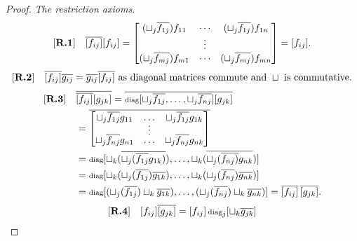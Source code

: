 \begin{proof}
  \emph{The restriction axioms.}
  \begin{align*}
    [\text{\bfseries {R}.{1}}] \quad& \overline{[f_{ij}]}[f_{ij}] =
      \begin{bmatrix}
        (\sqcup_j \overline{f_{1j}}) f_{11} & \cdots & (\sqcup_j \overline{f_{1 j}}) f_{1n}\\
        & \vdots & \\
        (\sqcup_j \overline{f_{mj}}) f_{m1} & \cdots & (\sqcup_j \overline{f_{mj}}) f_{m n}
      \end{bmatrix} = [f_{ij}].\\
  \end{align*}
  \begin{align*}
    [\text{\bfseries {R}.{2}}] \quad & \overline{[f_{ij}]} \overline{g_{ij}} =  \overline{g_{ij}} \overline{[f_{ij}]}
      \text{ as diagonal matrices commute and }\sqcup\text{ is commutative.}\\
  \end{align*}
  \begin{align*}
    [\text{\bfseries {R}.{3}}] \quad & \overline{\overline{[f_{ij}]}[g_{j k}]} =
      \overline{\operatorname{\scriptstyle{diag}}[\sqcup_j \overline{f_{1j}},\ldots,\sqcup_j \overline{f_{n j}}] [g_{j k}]}
      \\
      & = \overline{\begin{bmatrix}
        \sqcup_j \overline{f_{1j}} g_{11} & \ldots & \sqcup_j \overline{f_{1 j}} g_{1 k}\\[-4pt]
        & \vdots & \\[-4pt]
        \sqcup_j \overline{f_{nj}} g_{n 1} & \ldots & \sqcup_j \overline{f_{n j}} g_{n k}\\
      \end{bmatrix}} \\
      & = \operatorname{\scriptstyle{diag}}[\sqcup_k (\overline{\sqcup_j (\overline{f_{1j}} g_{1k})}), \ldots,
                 \sqcup_k (\overline{\sqcup_j(\overline{f_{nj})} g_{n k}})]\\
      & = \operatorname{\scriptstyle{diag}}[\sqcup_k (\sqcup_j(\overline{f_{1j}}) \overline{g_{1k}}), \ldots,
                 \sqcup_k (\sqcup_j(\overline{f_{nj}}) \overline{g_{n k}})]\\
      & = \operatorname{\scriptstyle{diag}}[(\sqcup_j(\overline{f_{1j}}) \sqcup_k  \overline{g_{1k}}), \ldots,
                 (\sqcup_j(\overline{f_{nj}}) \sqcup_k  \overline{g_{n k}})] = \overline{[f_{ij}]}\,\overline{[g_{j k}]}.\\
  \end{align*}
  \begin{align*}
      \rfour \quad & [f_{i\jay}]\rst{[g_{\jay k}]} =
        [f_{i\jay}]\diag_\jay[\djoin_k \rst{g_{\jay k}}]
        \\

\end{align*}
\end{proof}
